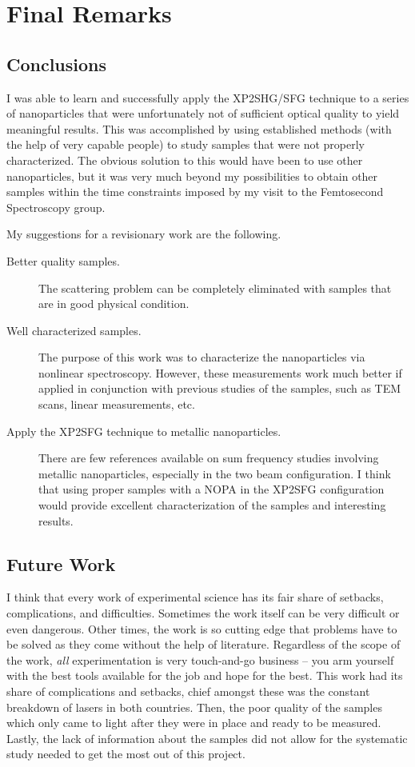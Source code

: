 \chapter{Final Remarks}\label{chap:conclusions}
\partialtoc


\section{Conclusions}
I was able to learn and successfully apply the XP2SHG/SFG technique to a series
of nanoparticles that were unfortunately not of sufficient optical quality to
yield meaningful results. This was accomplished by using established methods
(with the help of very capable people) to study samples that were not properly
characterized. The obvious solution to this would have been to use other
nanoparticles, but it was very much beyond my possibilities to obtain other
samples within the time constraints imposed by my visit to the Femtosecond
Spectroscopy group.

My suggestions for a revisionary work are the following.

\begin{description}
\item[Better quality samples.] The scattering problem can be completely
eliminated with samples that are in good physical condition.
\item[Well characterized samples.] The purpose of this work was to characterize
the nanoparticles via nonlinear spectroscopy. However, these measurements work
much better if applied in conjunction with previous studies of the samples, such
as TEM scans, linear measurements, etc.
\item[Apply the XP2SFG technique to metallic nanoparticles.] There are few
references available on sum frequency studies involving metallic nanoparticles,
especially in the two beam configuration. I think that using proper samples with
a NOPA in the XP2SFG configuration would provide excellent characterization of
the samples and interesting results.
\end{description}

\section{Future Work}
I think that every work of experimental science has its fair share of setbacks,
complications, and difficulties. Sometimes the work itself can be very difficult
or even dangerous. Other times, the work is so cutting edge that problems have
to be solved as they come without the help of literature. Regardless of the
scope of the work, \emph{all} experimentation is very touch-and-go business --
you arm yourself with the best tools available for the job and hope for the
best. This work had its share of complications and setbacks, chief amongst these
was the constant breakdown of lasers in both countries. Then, the poor quality
of the samples which only came to light after they were in place and ready to be
measured. Lastly, the lack of information about the samples did not allow for
the systematic study needed to get the most out of this project.


